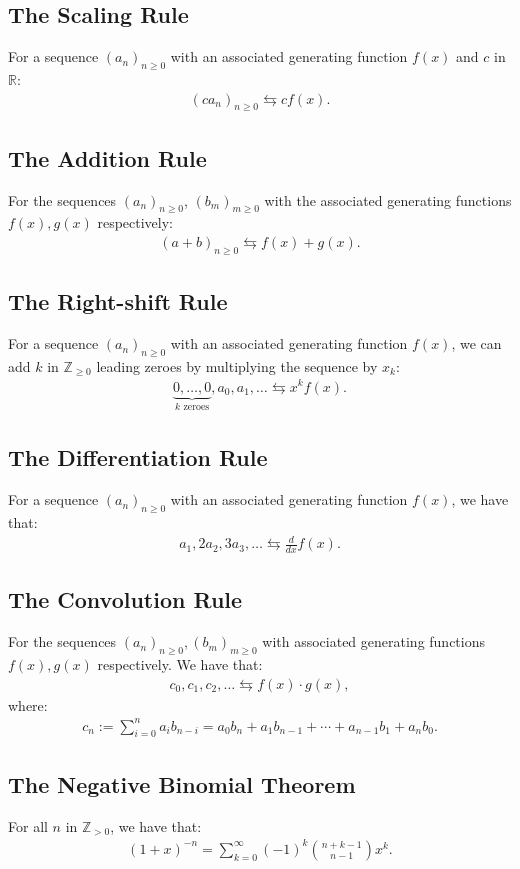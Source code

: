 \subsection{The Scaling Rule}

For a sequence $(a_n)_{n \geq 0}$ with an
associated generating function $f(x)$ and $c$ in $\mathbb{R}$: \begin{gather*}
  (ca_n)_{n \geq 0} \leftrightarrows cf(x).
\end{gather*}

\subsection{The Addition Rule}

For the sequences $(a_n)_{n \geq 0}$, $(b_m)_{m \geq 0}$ 
with the associated generating functions $f(x), g(x)$ respectively: \begin{gather*}
  (a + b)_{n \geq 0} \leftrightarrows f(x) + g(x).
\end{gather*}

\subsection{The Right-shift Rule}

For a sequence $(a_n)_{n \geq 0}$ with an associated generating 
function $f(x)$, we can add $k$ in $\mathbb{Z}_{\geq 0}$ leading zeroes by
multiplying the sequence by $x_k$: \begin{gather*}
  \underbrace{0, \ldots, 0}_\text{$k$ zeroes}, a_0, a_1, \ldots \leftrightarrows x^kf(x).
\end{gather*}

\subsection{The Differentiation Rule}

For a sequence $(a_n)_{n \geq 0}$ with an associated generating 
function $f(x)$, we have that: \begin{gather*}
  a_1, 2a_2, 3a_3, \ldots \leftrightarrows \frac{d}{dx}f(x).
\end{gather*}

\subsection{The Convolution Rule}

For the sequences $(a_n)_{n \geq 0}, (b_m)_{m \geq 0}$ with 
associated generating functions $f(x), g(x)$ respectively.
We have that: \begin{gather*}
  c_0, c_1, c_2, \ldots \leftrightarrows f(x) \cdot g(x),
\end{gather*} where: \begin{gather*}
  c_n := \sum_{i = 0}^{n} a_ib_{n - i} = a_0b_n + a_1b_{n-1} 
  + \cdots + a_{n-1}b_1 + a_nb_0.
\end{gather*}

\subsection{The Negative Binomial Theorem}

For all $n$ in $\mathbb{Z}_{> 0}$, we have that: \begin{gather*}
  (1 + x)^{-n} = \sum_{k = 0}^\infty (-1)^k\binom{n + k - 1}{n - 1}x^k.
\end{gather*}